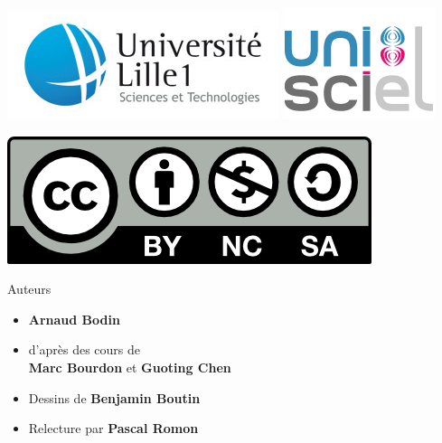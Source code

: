 








\begin{frame}

\thispagestyle{empty}    

  \hspace*{-20ex}
  \begin{minipage}{0.6\textwidth}
  \begin{center}
    \vspace*{5ex}   


    \bigskip

    \includegraphics[scale=0.3]{../divers/logotypeLille1-QUADRI-ECRAN.jpg}
    \quad
    \includegraphics[scale=0.3]{../divers/logo-unisciel.png}

    \vspace*{5ex}

    \includegraphics[scale=0.5]{../divers/by-nc-sa.png}
  \end{center}
  \end{minipage}
  \hfil
  \begin{minipage}{0.55\textwidth}
  \vspace*{5ex}
  Auteurs
  \begin{itemize}
    \item {\bf Arnaud Bodin}
    \item d'après des cours de \\ {\bf Marc Bourdon} et {\bf Guoting Chen}
    \item Dessins de {\bf Benjamin Boutin}
    \item Relecture par {\bf Pascal Romon}
  \end{itemize}


\end{minipage}
\end{frame}
